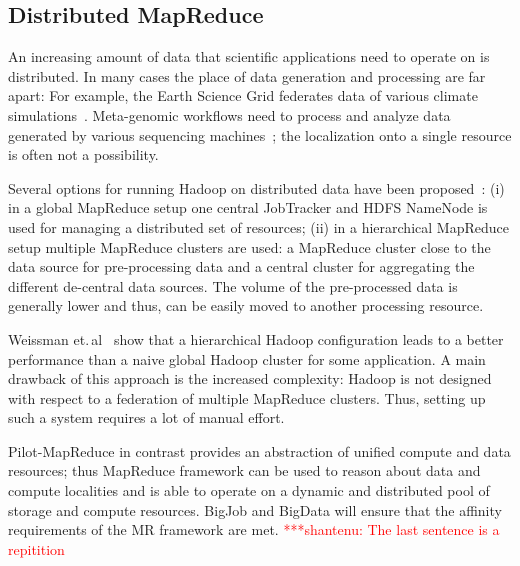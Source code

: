 \documentclass{acm_proc_article-sp}
\newcommand{\jhanote}[1]{ {\textcolor{red} { ***shantenu: #1 }}}
\newcommand{\jhanote}[1]{}
\newcommand{\pilotmapreduce}{Pilot-MapReduce\xspace}
\begin{document}
\subsection{Distributed MapReduce}
\label{sec:pmr-distributed}
An increasing amount of data that scientific applications need to
operate on is distributed. In many cases the place of data generation
and processing are far apart: For example, the Earth Science Grid
federates data of various climate simulations~\cite{ESG}. Meta-genomic
workflows need to process and analyze data generated by various
sequencing machines~\cite{Jha:2011fk}; the localization onto a single
resource is often not a possibility.

Several options for running Hadoop on distributed data have been
proposed~\cite{weissman-mr-11}: (i) in a global MapReduce setup one
central JobTracker and HDFS NameNode is used for managing a
distributed set of resources; (ii) in a hierarchical MapReduce setup
multiple MapReduce clusters are used: a MapReduce cluster close to the
data source for pre-processing data and a central cluster for
aggregating the different de-central data sources. The volume of the
pre-processed data is generally lower and thus, can be easily moved to
another processing resource. 

Weissman et.\,al~\cite{weissman-mr-11} show that a hierarchical Hadoop
configuration leads to a better performance than a naive global Hadoop
cluster for some application. A main drawback of this approach is the
increased complexity: Hadoop is not designed with respect to a
federation of multiple MapReduce clusters. Thus, setting up such a
system requires a lot of manual effort. 

\pilotmapreduce in contrast provides an abstraction of unified compute
and data resources; thus MapReduce framework can be used to reason
about data and compute localities and is able to operate on a dynamic
and distributed pool of storage and compute resources.  BigJob and
BigData will ensure that the affinity requirements of the MR framework
are met. \jhanote{The last sentence is a repitition}
\end{document}
